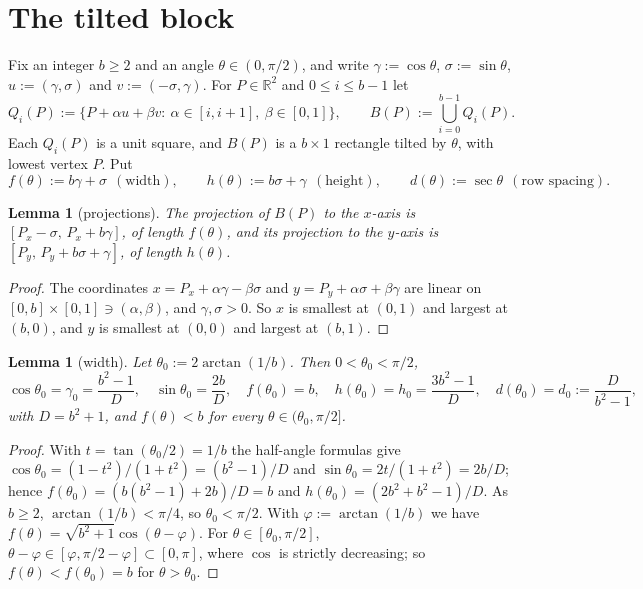 \documentclass[11pt]{amsart}
\newcommand{\R}{\mathbb R}
\newtheorem{lemma}[theorem]{Lemma}
\theoremstyle{definition}
\theoremstyle{remark}
\numberwithin{equation}{section}
\begin{document}
\section{The tilted block}\label{sec:block}

Fix an integer $b\ge2$ and an angle $\theta\in(0,\pi/2)$, and write $\gamma:=\cos\theta$, $\sigma:=\sin\theta$,
$u:=(\gamma,\sigma)$ and $v:=(-\sigma,\gamma)$. For $P\in\R^2$ and $0\le i\le b-1$ let
\[
Q_i(P):=\{P+\alpha u+\beta v:\ \alpha\in[i,i+1],\ \beta\in[0,1]\},\qquad B(P):=\bigcup_{i=0}^{b-1}Q_i(P).
\]
Each $Q_i(P)$ is a unit square, and $B(P)$ is a $b\times1$ rectangle tilted by $\theta$, with lowest vertex $P$. Put
\[
f(\theta):=b\gamma+\sigma\ \ (\text{width}),\qquad h(\theta):=b\sigma+\gamma\ \ (\text{height}),\qquad
d(\theta):=\sec\theta\ \ (\text{row spacing}).
\]

\begin{lemma}[projections]\label{lem:proj}
The projection of $B(P)$ to the $x$-axis is $[P_x-\sigma,\,P_x+b\gamma]$, of length $f(\theta)$, and its projection to the
$y$-axis is $[P_y,\,P_y+b\sigma+\gamma]$, of length $h(\theta)$.
\end{lemma}

\begin{proof}
The coordinates $x=P_x+\alpha\gamma-\beta\sigma$ and $y=P_y+\alpha\sigma+\beta\gamma$ are linear on
$[0,b]\times[0,1]\ni(\alpha,\beta)$, and $\gamma,\sigma>0$. So $x$ is smallest at $(0,1)$ and largest at $(b,0)$, and $y$
is smallest at $(0,0)$ and largest at $(b,1)$.
\end{proof}

\begin{lemma}[width]\label{lem:width}
Let $\theta_0:=2\arctan(1/b)$. Then $0<\theta_0<\pi/2$,
\[
\cos\theta_0=\gamma_0=\frac{b^2-1}{D},\quad \sin\theta_0=\frac{2b}{D},\quad f(\theta_0)=b,\quad
h(\theta_0)=h_0=\frac{3b^2-1}{D},\quad d(\theta_0)=d_0:=\frac{D}{b^2-1},
\]
with $D=b^2+1$, and $f(\theta)<b$ for every $\theta\in(\theta_0,\pi/2]$.
\end{lemma}

\begin{proof}
With $t=\tan(\theta_0/2)=1/b$ the half-angle formulas give $\cos\theta_0=(1-t^2)/(1+t^2)=(b^2-1)/D$ and
$\sin\theta_0=2t/(1+t^2)=2b/D$; hence $f(\theta_0)=(b(b^2-1)+2b)/D=b$ and $h(\theta_0)=(2b^2+b^2-1)/D$. As $b\ge2$,
$\arctan(1/b)<\pi/4$, so $\theta_0<\pi/2$. With $\varphi:=\arctan(1/b)$ we have $f(\theta)=\sqrt{b^2+1}\cos(\theta-\varphi)$.
For $\theta\in[\theta_0,\pi/2]$, $\theta-\varphi\in[\varphi,\pi/2-\varphi]\subset[0,\pi]$, where $\cos$ is strictly
decreasing; so $f(\theta)<f(\theta_0)=b$ for $\theta>\theta_0$.
\end{proof}
\end{document}
